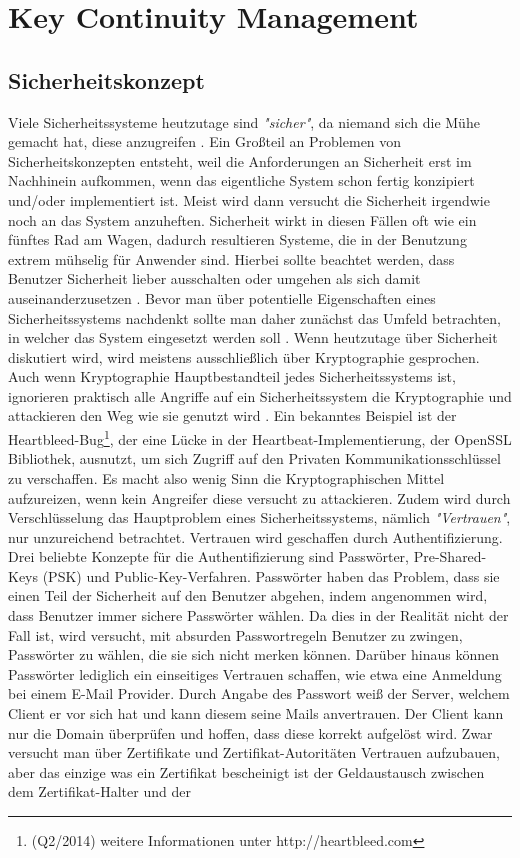 \documentclass[11pt,a4paper]{report}
\begin{document}
\section{Key Continuity Management}



\subsection{Sicherheitskonzept} \label{sec:security_conzept}

Viele Sicherheitssysteme heutzutage sind \textit{"sicher"}, da niemand sich die Mühe gemacht hat, diese anzugreifen \cite{gutmann0}. Ein Großteil an Problemen von Sicherheitskonzepten entsteht, weil die Anforderungen an Sicherheit erst im Nachhinein aufkommen, wenn das eigentliche System schon fertig konzipiert und/oder implementiert ist. Meist wird dann versucht die Sicherheit irgendwie noch an das System anzuheften. Sicherheit wirkt in diesen Fällen oft wie ein fünftes Rad am Wagen, dadurch resultieren Systeme, die in der Benutzung extrem mühselig für Anwender sind. Hierbei sollte beachtet werden, dass Benutzer Sicherheit lieber ausschalten oder umgehen als sich damit auseinanderzusetzen \cite{gutmann5}. Bevor man über potentielle Eigenschaften eines Sicherheitssystems nachdenkt sollte man daher zunächst das Umfeld betrachten, in welcher das System eingesetzt werden soll \cite{gutmann4}. Wenn heutzutage über Sicherheit diskutiert wird, wird meistens ausschließlich über Kryptographie gesprochen. Auch wenn Kryptographie Hauptbestandteil jedes Sicherheitssystems ist, ignorieren praktisch alle Angriffe auf ein Sicherheitssystem die Kryptographie und attackieren den Weg wie sie genutzt wird \cite{gutmann1}. Ein bekanntes Beispiel ist der Heartbleed-Bug\footnote{(Q2/2014) weitere Informationen unter http://heartbleed.com}, der eine Lücke in der Heartbeat-Implementierung, der OpenSSL Bibliothek, ausnutzt, um sich Zugriff auf den Privaten Kommunikationsschlüssel zu verschaffen. Es macht also wenig Sinn die Kryptographischen Mittel aufzureizen, wenn kein Angreifer diese versucht zu attackieren. Zudem wird durch Verschlüsselung das Hauptproblem eines Sicherheitssystems, nämlich \textit{"Vertrauen"}, nur unzureichend betrachtet. Vertrauen wird geschaffen durch Authentifizierung. Drei beliebte Konzepte für die Authentifizierung sind Passwörter, Pre-Shared-Keys (PSK) und Public-Key-Verfahren. Passwörter haben das Problem, dass sie einen Teil der Sicherheit auf den Benutzer abgehen, indem angenommen wird, dass Benutzer immer sichere Passwörter wählen. Da dies in der Realität nicht der Fall ist, wird versucht, mit absurden Passwortregeln Benutzer zu zwingen, Passwörter zu wählen, die sie sich nicht merken können. Darüber hinaus können Passwörter lediglich ein einseitiges Vertrauen schaffen, wie etwa eine Anmeldung bei einem E-Mail Provider. Durch Angabe des Passwort weiß der Server, welchem Client er vor sich hat und kann diesem seine Mails anvertrauen. Der Client kann nur die Domain überprüfen und hoffen, dass diese korrekt aufgelöst wird. Zwar versucht man über Zertifikate und Zertifikat-Autoritäten Vertrauen aufzubauen, aber das einzige was ein Zertifikat bescheinigt ist der Geldaustausch zwischen dem Zertifikat-Halter und der 
\end{document}

